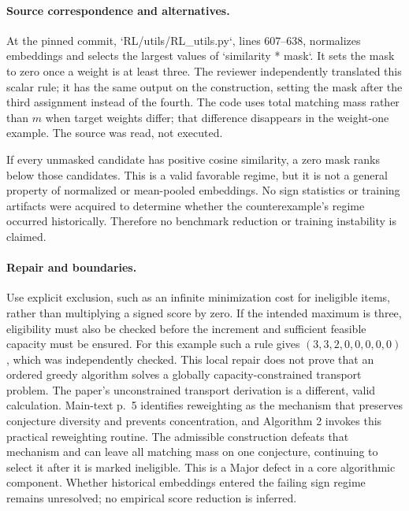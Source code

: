 \documentclass[10pt]{article}
\begin{document}
\paragraph*{Source correspondence and alternatives.}\mbox{}\par
At the pinned commit, `RL/utils/RL\_utils.py`, lines 607–638, normalizes embeddings and selects the largest values of `similarity * mask`. It sets the mask to zero once a weight is at least three. The reviewer independently translated this scalar rule; it has the same output on the construction, setting the mask after the third assignment instead of the fourth. The code uses total matching mass rather than \(m\) when target weights differ; that difference disappears in the weight-one example. The source was read, not executed.\par
If every unmasked candidate has positive cosine similarity, a zero mask ranks below those candidates. This is a valid favorable regime, but it is not a general property of normalized or mean-pooled embeddings. No sign statistics or training artifacts were acquired to determine whether the counterexample’s regime occurred historically. Therefore no benchmark reduction or training instability is claimed.\par
\paragraph*{Repair and boundaries.}\mbox{}\par
Use explicit exclusion, such as an infinite minimization cost for ineligible items, rather than multiplying a signed score by zero. If the intended maximum is three, eligibility must also be checked before the increment and sufficient feasible capacity must be ensured. For this example such a rule gives \((3,3,2,0,0,0,0,0)\), which was independently checked. This local repair does not prove that an ordered greedy algorithm solves a globally capacity-constrained transport problem. The paper’s unconstrained transport derivation is a different, valid calculation. Main-text p. 5 identifies reweighting as the mechanism that preserves conjecture diversity and prevents concentration, and Algorithm 2 invokes this practical reweighting routine. The admissible construction defeats that mechanism and can leave all matching mass on one conjecture, continuing to select it after it is marked ineligible. This is a Major defect in a core algorithmic component. Whether historical embeddings entered the failing sign regime remains unresolved; no empirical score reduction is inferred.\par
\end{document}
